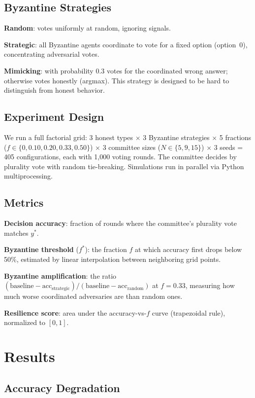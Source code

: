 \documentclass[11pt]{article}
\begin{document}
\subsection{Byzantine Strategies}

\textbf{Random}: votes uniformly at random, ignoring signals.

\textbf{Strategic}: all Byzantine agents coordinate to vote for a fixed option (option~0), concentrating adversarial votes.

\textbf{Mimicking}: with probability 0.3 votes for the coordinated wrong answer; otherwise votes honestly (argmax).
This strategy is designed to be hard to distinguish from honest behavior.

\subsection{Experiment Design}

We run a full factorial grid: 3 honest types $\times$ 3 Byzantine strategies $\times$ 5 fractions ($f \in \{0, 0.10, 0.20, 0.33, 0.50\}$) $\times$ 3 committee sizes ($N \in \{5, 9, 15\}$) $\times$ 3 seeds = 405 configurations, each with 1{,}000 voting rounds.
The committee decides by plurality vote with random tie-breaking.
Simulations run in parallel via Python multiprocessing.

\subsection{Metrics}

\textbf{Decision accuracy}: fraction of rounds where the committee's plurality vote matches $y^*$.

\textbf{Byzantine threshold} ($f^*$): the fraction $f$ at which accuracy first drops below 50\%, estimated by linear interpolation between neighboring grid points.

\textbf{Byzantine amplification}: the ratio $(\text{baseline} - \text{acc}_{\text{strategic}}) / (\text{baseline} - \text{acc}_{\text{random}})$ at $f = 0.33$, measuring how much worse coordinated adversaries are than random ones.

\textbf{Resilience score}: area under the accuracy-vs-$f$ curve (trapezoidal rule), normalized to $[0, 1]$.

\section{Results}

\subsection{Accuracy Degradation}
\end{document}
